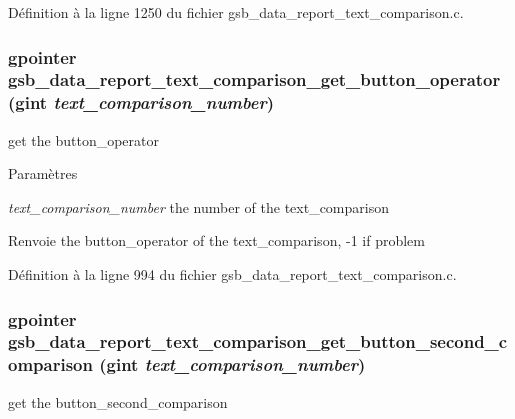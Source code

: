 Définition à la ligne 1250 du fichier gsb\_\-data\_\-report\_\-text\_\-comparison.c.

\subsubsection[{gsb\_\-data\_\-report\_\-text\_\-comparison\_\-get\_\-button\_\-operator}]{\setlength{\rightskip}{0pt plus 5cm}gpointer gsb\_\-data\_\-report\_\-text\_\-comparison\_\-get\_\-button\_\-operator (gint {\em text\_\-comparison\_\-number})}\label{gsb__data__report__text__comparison_8h_af7aa72ef5007f9416ec1137ee5901834}
get the button\_\-operator


\begin{DoxyParams}{Paramètres}
\item[{\em text\_\-comparison\_\-number}]the number of the text\_\-comparison\end{DoxyParams}
\begin{DoxyReturn}{Renvoie}
the button\_\-operator of the text\_\-comparison, -\/1 if problem 
\end{DoxyReturn}


Définition à la ligne 994 du fichier gsb\_\-data\_\-report\_\-text\_\-comparison.c.

\subsubsection[{gsb\_\-data\_\-report\_\-text\_\-comparison\_\-get\_\-button\_\-second\_\-comparison}]{\setlength{\rightskip}{0pt plus 5cm}gpointer gsb\_\-data\_\-report\_\-text\_\-comparison\_\-get\_\-button\_\-second\_\-comparison (gint {\em text\_\-comparison\_\-number})}\label{gsb__data__report__text__comparison_8h_ac59873572d63412f35795f65988f9d9b}
get the button\_\-second\_\-comparison


